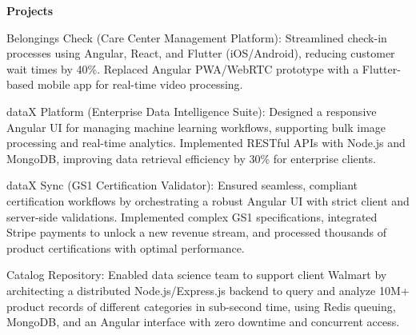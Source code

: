 
\normalsize\textbf{Projects}\vspace{4pt}
\begin{sectionContainer}
	{Belongings Check (Care Center Management Platform):} {Streamlined check-in processes using Angular, React, and Flutter (iOS/Android), reducing customer wait times by 40\%. Replaced Angular PWA/WebRTC prototype with a Flutter-based mobile app for real-time video processing.}
\end{sectionContainer}

\begin{sectionContainer}
	{dataX Platform (Enterprise Data Intelligence Suite):} {Designed a responsive Angular UI for managing machine learning workflows, supporting bulk image processing and real-time analytics. Implemented RESTful APIs with Node.js and MongoDB, improving data retrieval efficiency by 30\% for enterprise clients.}
\end{sectionContainer}

\begin{sectionContainer}
	{dataX Sync (GS1 Certification Validator):} {Ensured seamless, compliant certification workflows by orchestrating a robust Angular UI with strict client and server-side validations. Implemented complex GS1 specifications, integrated Stripe payments to unlock a new revenue stream, and processed thousands of product certifications with optimal performance.}
\end{sectionContainer}

\begin{sectionContainer}
	{Catalog Repository:} {Enabled data science team to support client Walmart by architecting a distributed Node.js/Express.js backend to query and analyze 10M+ product records of different categories in sub-second time, using Redis queuing, MongoDB, and an Angular interface with zero downtime and concurrent access.}
\end{sectionContainer}

